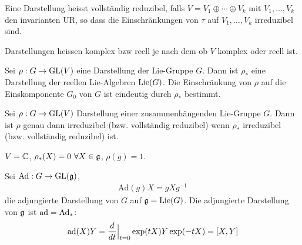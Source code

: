 \begin{definition}
    Eine Darstellung heisst vollständig reduzibel, falls
    $V = V_1 \oplus \dotsb \oplus V_k$ mit $V_1,\dots,V_k$ den invarianten
    UR, so dass die Einschränkungen von $\tau$ auf $V_1,\dots,V_k$ irreduzibel
    sind.
\end{definition}

\begin{definition}
    Darstellungen heissen komplex bzw reell je nach dem ob $V$ komplex
    oder reell ist.
\end{definition}

\begin{satz}
    Sei $\rho: G \rightarrow \text{GL}(V)$ eine Darstellung der Lie-Gruppe $G$.
    Dann ist $\rho_\ast$ eine Darstellung der reellen Lie-Algebren $\text{Lie}(G)$.
    Die Einschränkung von $\rho$ auf die Einskomponente $G_0$ von $G$ ist
    eindeutig durch $\rho_\ast$ bestimmt.
\end{satz}

\begin{satz}
    Sei $\rho: G \rightarrow \text{GL}(V)$ Darstellung einer zusammenhängenden
    Lie-Gruppe $G$. Dann ist $\rho$ genau dann irreduzibel (bzw. vollständig
    reduzibel) wenn $\rho_\ast$ irreduzibel (bzw. vollständig reduzibel) ist.
\end{satz}

\begin{beispiel}
    $V = \mathbb{C}$, $\rho_\ast (X) = 0 \ \forall X \in \mathfrak{g}$, $\rho(g) = 1$.
\end{beispiel}

\begin{beispiel}
    Sei $\text{Ad}: G \rightarrow \text{GL}(\mathfrak{g})$,
    \begin{align*}
        \text{Ad} (g) X = g X g^{-1}
    \end{align*}
    die adjungierte Darstellung von $G$ auf $\mathfrak{g} = \text{Lie}(G)$. Die adjungierte
    Darstellung von $\mathfrak{g}$ ist $\text{ad} = \text{Ad}_\ast$:
    \begin{align*}
        \text{ad} (X) Y = \frac{d}{dt} \Big|_{t=0} \exp (t X) Y \exp(-tX) = \left[ X,Y \right]
    \end{align*}
\end{beispiel}

